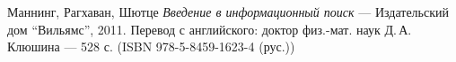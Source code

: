 \begin{thebibliography}{99}
Маннинг, Рагхаван, Шютце
{\itshape Введение в информационный поиск} --- Издательский дом \enquote{Вильямс}, 2011. Перевод с английского: доктор физ.-мат. наук Д.\,А.\, Клюшина --- 528 с. (ISBN 978-5-8459-1623-4 (рус.))
\end{thebibliography}
\pagebreak


